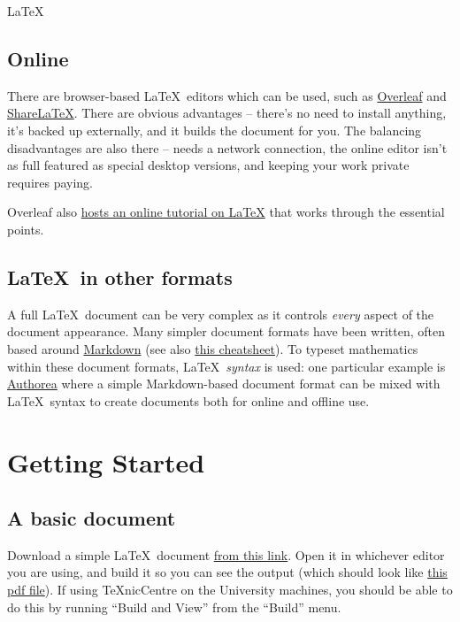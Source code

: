 \begin{chapter}{\LaTeX}
\subsection{Online}

There are browser-based \LaTeX\ editors which can be used, such as \href{https://www.overleaf.com/}{Overleaf} and \href{https://www.sharelatex.com/}{ShareLaTeX}. There are obvious advantages -- there's no need to install anything, it's backed up externally, and it builds the document for you. The balancing disadvantages are also there -- needs a network connection, the online editor isn't as full featured as special desktop versions, and keeping your work private requires paying.

Overleaf also \href{https://www.overleaf.com/latex/learn/free-online-introduction-to-latex-part-1}{hosts an online tutorial on \LaTeX} that works through the essential points.

\subsection{\LaTeX\ in other formats}

A full \LaTeX\ document can be very complex as it controls \emph{every} aspect of the document appearance. Many simpler document formats have been written, often based around \href{http://daringfireball.net/projects/markdown/}{Markdown} (see also \href{https://github.com/adam-p/markdown-here/wiki/Markdown-Cheatsheet}{this cheatsheet}). To typeset mathematics within these document formats, \LaTeX\ \emph{syntax} is used: one particular example is \href{https://www.authorea.com}{Authorea} where a simple Markdown-based document format can be mixed with \LaTeX\ syntax to create documents both for online and offline use.

\section{Getting Started}

\subsection{A basic document}

Download a simple \LaTeX\ document \href{https://raw.githubusercontent.com/IanHawke/maths-with-python/master/latex/BasicLatex.tex}{from this link}. Open it in whichever editor you are using, and build it so you can see the output (which should look like \href{https://github.com/IanHawke/maths-with-python/raw/master/latex/BasicLatex.pdf}{this pdf file}). If using TeXnicCentre on the University machines, you should be able to do this by running ``Build and View'' from the ``Build'' menu.


\end{chapter}
